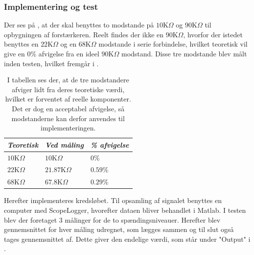 \subsubsection{Implementering og test}
Der ses på , at der skal benyttes to modstande på $10$K$\Omega$ og $90$K$\Omega$ til opbygningen af forstærkeren. Reelt findes der ikke en $90$K$\Omega$, hvorfor der istedet benyttes en $22$K$\Omega$ og en $68$K$\Omega$ modstande i serie forbindelse, hvilket teoretisk vil give en $0$\% afvigelse fra en ideel $90$K$\Omega$ modstand. Disse tre modstande blev målt inden testen, hvilket fremgår i .
\begin{table}[H]
	\centering
	\begin{tabular}{|l|l|l|}
		\hline
		\textit{Teoretisk} & \textit{Ved måling} & \textit{\% afvigelse} \\ \hline
		$10$K$\Omega$       & $10$K$\Omega$        & $0$\%               \\ \hline
		$22$K$\Omega$      & $21.87$K$\Omega$     & $0.59$\%               \\ \hline
		$68$K$\Omega$      & $67.8$K$\Omega$       & $0.29$\%               \\ \hline
	\end{tabular}
	\caption{I tabellen ses der, at de tre modstandere afviger lidt fra deres teoretiske værdi, hvilket er forventet af reelle komponenter. Det er dog en acceptabel afvigelse, så modstanderne kan derfor anvendes til implementeringen.}
	\label{Tab:modstand_faktor18}
\end{table}
\noindent Herefter implementeres kredsløbet. Til opsamling af signalet benyttes en computer med ScopeLogger, hvorefter dataen bliver behandlet i Matlab. I testen blev der foretaget 3 målinger for de to spændingsniveauer. Herefter blev gennemsnittet for hver måling udregnet, som lægges sammen og til slut også tages gennemsnittet af. Dette giver den endelige værdi, som står under "Output" i .\
